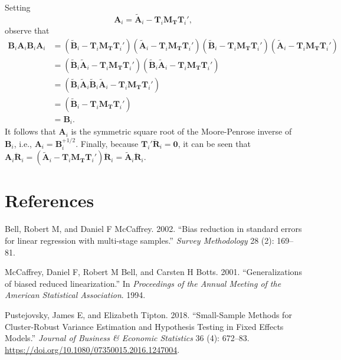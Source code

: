 \documentclass[12pt]{article}
\newlength{\cslhangindent}
\newlength{\cslentryspacingunit} %
\newenvironment{CSLReferences}[2] %
 {%
  \setlength{\parindent}{0pt}
  \ifodd #1
  \let\oldpar\par
  \def\par{\hangindent=\cslhangindent\oldpar}
  \fi
  \setlength{\parskip}{#2\cslentryspacingunit}
 }%
 {}
\begin{document}
Setting \begin{equation}
\mathbf{A}_i = \tilde{\mathbf{A}}_i - \mathbf{T}_i \mathbf{M_T}\mathbf{T}_i',
\end{equation} observe that \begin{align*}
\mathbf{B}_i \mathbf{A}_i \mathbf{B}_i \mathbf{A}_i &= \left(\tilde{\mathbf{B}}_i - \mathbf{T}_i \mathbf{M_T}\mathbf{T}_i'\right) \left(\tilde{\mathbf{A}}_i - \mathbf{T}_i \mathbf{M_T}\mathbf{T}_i'\right)\left(\tilde{\mathbf{B}}_i - \mathbf{T}_i \mathbf{M_T}\mathbf{T}_i'\right) \left(\tilde{\mathbf{A}}_i - \mathbf{T}_i \mathbf{M_T}\mathbf{T}_i'\right) \\
&= \left(\tilde{\mathbf{B}}_i\tilde{\mathbf{A}}_i - \mathbf{T}_i \mathbf{M_T}\mathbf{T}_i'\right)\left(\tilde{\mathbf{B}}_i\tilde{\mathbf{A}}_i - \mathbf{T}_i \mathbf{M_T}\mathbf{T}_i'\right) \\
&= \left(\tilde{\mathbf{B}}_i\tilde{\mathbf{A}}_i\tilde{\mathbf{B}}_i\tilde{\mathbf{A}}_i - \mathbf{T}_i \mathbf{M_T}\mathbf{T}_i'\right) \\
&= \left(\tilde{\mathbf{B}}_i - \mathbf{T}_i \mathbf{M_T}\mathbf{T}_i'\right) \\
&= \mathbf{B}_i.
\end{align*} It follows that \(\mathbf{A}_i\) is the symmetric square
root of the Moore-Penrose inverse of \(\mathbf{B}_i\), i.e.,
\(\mathbf{A}_i = \mathbf{B}_i^{+1/2}\). Finally, because
\(\mathbf{T}_i ' \mathbf{\ddot{R}}_i= \mathbf{0}\), it can be seen that
\(\mathbf{A}_i \mathbf{\ddot{R}}_i = \left(\tilde{\mathbf{A}}_i - \mathbf{T}_i \mathbf{M_T}\mathbf{T}_i'\right)\mathbf{\ddot{R}}_i = \tilde{\mathbf{A}}_i \mathbf{\ddot{R}}_i\).

\hypertarget{references}{%
\section*{References}\label{references}}

\hypertarget{refs}{}
\begin{CSLReferences}{1}{0}
\leavevmode{}%
Bell, Robert M, and Daniel F McCaffrey. 2002. {``{Bias reduction in
standard errors for linear regression with multi-stage samples}.''}
\emph{Survey Methodology} 28 (2): 169--81.

\leavevmode{}%
McCaffrey, Daniel F, Robert M Bell, and Carsten H Botts. 2001.
{``{Generalizations of biased reduced linearization}.''} In
\emph{Proceedings of the Annual Meeting of the American Statistical
Association}. 1994.

\leavevmode{}%
Pustejovsky, James E, and Elizabeth Tipton. 2018. {``Small-Sample
Methods for Cluster-Robust Variance Estimation and Hypothesis Testing in
Fixed Effects Models.''} \emph{Journal of Business \& Economic
Statistics} 36 (4): 672--83.
\url{https://doi.org/10.1080/07350015.2016.1247004}.

\end{CSLReferences}



\end{document}
